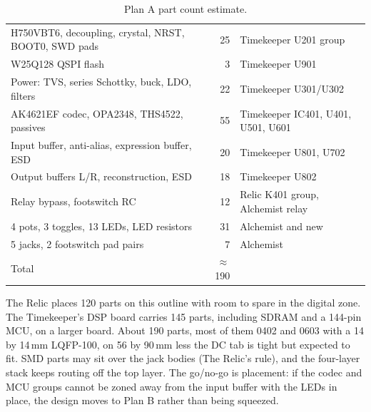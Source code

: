 \begin{table}[H]
  \small\renewcommand{\arraystretch}{1.12}
  \caption{Plan A part count estimate.}\label{tab:fit}
  \begin{tabularx}{\textwidth}{@{}L r >{\raggedright\arraybackslash}p{40mm}@{}}
    \toprule
     &  &  \\
    \midrule
    H750VBT6, decoupling, crystal, NRST, BOOT0, SWD pads & 25 & Timekeeper U201 group \\
    W25Q128 QSPI flash & 3 & Timekeeper U901 \\
    Power: TVS, series Schottky, buck, LDO, filters & 22 & Timekeeper U301/U302 \\
    AK4621EF codec, OPA2348, THS4522, passives & 55 & Timekeeper IC401, U401, U501, U601 \\
    Input buffer, anti-alias, expression buffer, ESD & 20 & Timekeeper U801, U702 \\
    Output buffers L/R, reconstruction, ESD & 18 & Timekeeper U802 \\
    Relay bypass, footswitch RC & 12 & Relic K401 group, Alchemist relay \\
    4 pots, 3 toggles, 13 LEDs, LED resistors & 31 & Alchemist and new \\
    5 jacks, 2 footswitch pad pairs & 7 & Alchemist \\
    \midrule
    Total & $\approx$190 & \\
    \bottomrule
  \end{tabularx}
\end{table}

The Relic places 120 parts on this outline with room to spare in the digital zone. The Timekeeper's DSP board carries 145 parts, including SDRAM and a 144-pin MCU, on a larger board. About 190 parts, most of them 0402 and 0603 with a 14 by 14\,mm LQFP-100, on 56 by 90\,mm less the DC tab is tight but expected to fit. SMD parts may sit over the jack bodies (The Relic's rule), and the four-layer stack keeps routing off the top layer. The go/no-go is placement: if the codec and MCU groups cannot be zoned away from the input buffer with the LEDs in place, the design moves to Plan B rather than being squeezed.

